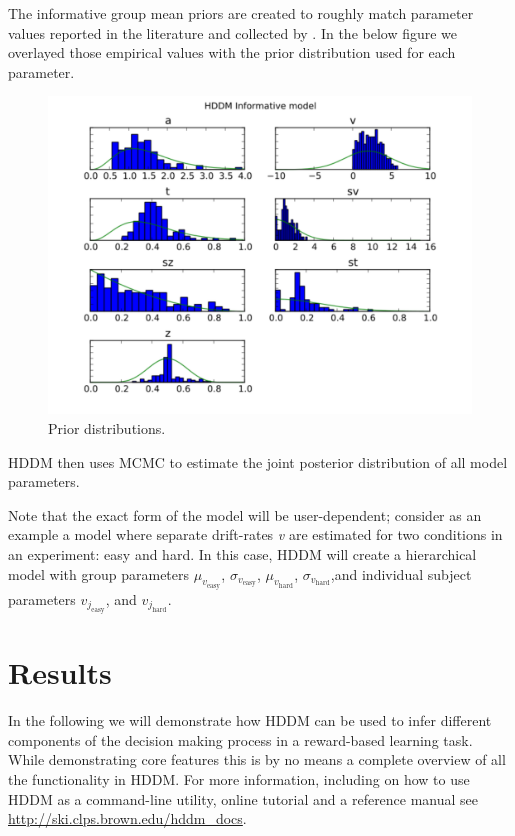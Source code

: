 \documentclass[letterpaper,10pt,english]{article}
\begin{document}
The informative group mean priors are created to roughly match parameter values reported in the literature and collected by \citep{MatzkeWagenmakers09}. In the below figure we overlayed those empirical values with the prior distribution used for each parameter.
\begin{figure}[htbp]
\centering
\includegraphics[scale=.5]{hddm_info_priors.pdf}
\caption{Prior distributions.}
\end{figure}

HDDM then uses MCMC to estimate the joint posterior distribution of
all model parameters.

Note that the exact form of the model will be user-dependent; consider as an example a model where separate drift-rates \emph{v} are estimated for two conditions in an experiment: easy and hard. In this case, HDDM will create a hierarchical model with group parameters $\mu_{v_{\text{easy}}}$, $\sigma_{v_{\text{easy}}}$, $\mu_{v_{\text{hard}}}$, $\sigma_{v_{\text{hard}}}$,and individual subject parameters $v_{j_{\text{easy}}}$, and $v_{j_{\text{hard}}}$.

\section*{Results}
\label{demo:index-0}\label{demo:demo}\label{demo:chap-demo}\label{demo::doc}\label{demo:patsy}
In the following we will demonstrate how HDDM can be used to infer different components of the decision making process in a reward-based learning task. While demonstrating core features this is by no means a complete overview of all the functionality in HDDM. For more information, including on how to use HDDM as a command-line utility, online tutorial and a reference manual see \href{http://ski.clps.brown.edu/hddm\_docs}{http://ski.clps.brown.edu/hddm\_docs}.
\end{document}
